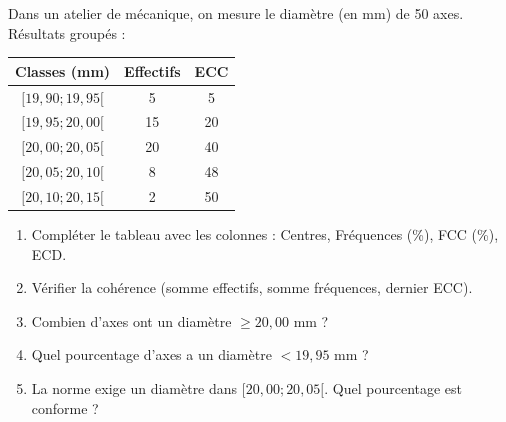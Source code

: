 \documentclass[11pt]{article}
\begin{document}
\begin{exercice}
Dans un atelier de mécanique, on mesure le diamètre (en mm) de 50 axes. Résultats groupés :
\begin{center}
\begin{tabular}{|c|c|c|}\hline
Classes (mm) & Effectifs & ECC \\ \hline
$[19,90 ; 19,95[$ & 5 & 5 \\ \hline
$[19,95 ; 20,00[$ & 15 & 20 \\ \hline
$[20,00 ; 20,05[$ & 20 & 40 \\ \hline
$[20,05 ; 20,10[$ & 8 & 48 \\ \hline
$[20,10 ; 20,15[$ & 2 & 50 \\ \hline
\end{tabular}
\end{center}
\begin{enumerate}
\item Compléter le tableau avec les colonnes : Centres, Fréquences (\%), FCC (\%), ECD.
\item Vérifier la cohérence (somme effectifs, somme fréquences, dernier ECC).
\item Combien d'axes ont un diamètre $\ge 20,00$ mm ?
\item Quel pourcentage d'axes a un diamètre $< 19,95$ mm ?
\item La norme exige un diamètre dans $[20,00 ; 20,05[$. Quel pourcentage est conforme ?
\end{enumerate}
\end{exercice}
\end{document}
